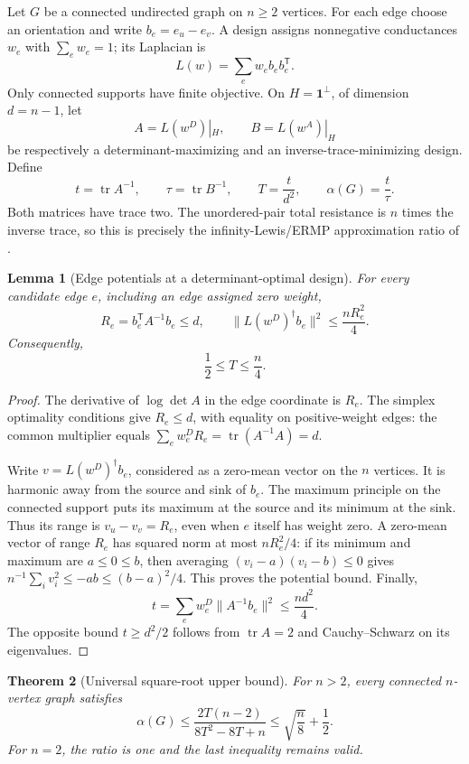 \documentclass[11pt,a4paper]{article}
\newtheorem{theorem}{Theorem}[section]
\newtheorem{lemma}[theorem]{Lemma}
\theoremstyle{definition}
\theoremstyle{remark}
\numberwithin{equation}{section}
\begin{document}
Let $G$ be a connected undirected graph on $n\geq2$ vertices.
For each edge choose an orientation and write $b_e=e_u-e_v$.
A design assigns nonnegative conductances $w_e$ with
$\sum_e w_e=1$; its Laplacian is
\[
 L(w)=\sum_e w_e b_e b_e^{\mathsf T}.
\]
Only connected supports have finite objective.
On $H=\mathbf1^\perp$, of dimension $d=n-1$, let
\[
 A=L(w^D)|_H,\qquad B=L(w^A)|_H
\]
be respectively a determinant-maximizing and an inverse-trace-minimizing
design.  Define
\[
 t=\operatorname{tr}A^{-1},\qquad
 \tau=\operatorname{tr}B^{-1},\qquad
 T=\frac{t}{d^2},\qquad
 \alpha(G)=\frac{t}{\tau}.
\]
Both matrices have trace two.  The unordered-pair total resistance is
$n$ times the inverse trace, so this is precisely the
infinity-Lewis/ERMP approximation ratio of
\cite{p2:SulimanWeinstein2023}.

\begin{lemma}[Edge potentials at a determinant-optimal design]
\label{p3:lem:general-edge-potentials}
For every candidate edge $e$, including an edge assigned zero weight,
\[
 R_e=b_e^{\mathsf T}A^{-1}b_e\leq d,
 \qquad
 \|L(w^D)^\dagger b_e\|^2\leq\frac{nR_e^2}{4}.
\]
Consequently,
\begin{equation}\label{p3:eq:general-trace-range}
 \frac12\leq T\leq\frac n4.
\end{equation}
\end{lemma}

\begin{proof}
The derivative of $\log\det A$ in the edge coordinate is $R_e$.
The simplex optimality conditions give $R_e\leq d$, with equality
on positive-weight edges: the common multiplier equals
$\sum_e w_e^D R_e=\operatorname{tr}(A^{-1}A)=d$.

Write $v=L(w^D)^\dagger b_e$, considered as a zero-mean vector on the
$n$ vertices.  It is harmonic away from the source and sink of $b_e$.
The maximum principle on the connected support puts its maximum at
the source and its minimum at the sink.  Thus its range is
$v_u-v_v=R_e$, even when $e$ itself has weight zero.
A zero-mean vector of range $R_e$ has squared norm at most
$nR_e^2/4$: if its minimum and maximum are $a\leq0\leq b$,
then averaging $(v_i-a)(v_i-b)\leq0$ gives
$n^{-1}\sum_i v_i^2\leq-ab\leq(b-a)^2/4$.
This proves the potential bound.
Finally,
\[
 t=\sum_e w_e^D\|A^{-1}b_e\|^2\leq\frac{nd^2}{4}.
\]
The opposite bound $t\geq d^2/2$ follows from
$\operatorname{tr}A=2$ and Cauchy--Schwarz on its eigenvalues.
\end{proof}

\begin{theorem}[Universal square-root upper bound]
\label{p3:thm:general-sqrt-upper}
For $n>2$, every connected $n$-vertex graph satisfies
\begin{equation}\label{p3:eq:general-trace-sensitive}
 \alpha(G)
 \leq\frac{2T(n-2)}{8T^2-8T+n}
 \leq\sqrt{\frac n8}+\frac12.
\end{equation}
For $n=2$, the ratio is one and the last inequality remains valid.
\end{theorem}
\end{document}
